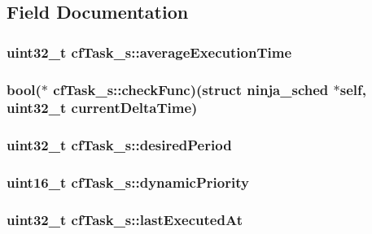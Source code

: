 \subsection{Field Documentation}
\hypertarget{structcfTask__s_a132b3b610c2181dcb2583ab23330abda}{
\subsubsection[{average\+Execution\+Time}]{\setlength{\rightskip}{0pt plus 5cm}uint32\+\_\+t cf\+Task\+\_\+s\+::average\+Execution\+Time}}\label{structcfTask__s_a132b3b610c2181dcb2583ab23330abda}
\hypertarget{structcfTask__s_a79e1d3beaa31d68bca80cb1057be23d5}{
\subsubsection[{check\+Func}]{\setlength{\rightskip}{0pt plus 5cm}bool($\ast$ cf\+Task\+\_\+s\+::check\+Func)(struct {\bf ninja\+\_\+sched} $\ast$self, uint32\+\_\+t current\+Delta\+Time)}}\label{structcfTask__s_a79e1d3beaa31d68bca80cb1057be23d5}
\hypertarget{structcfTask__s_adb81d1a2c7487daeb00adefa272b3c67}{
\subsubsection[{desired\+Period}]{\setlength{\rightskip}{0pt plus 5cm}uint32\+\_\+t cf\+Task\+\_\+s\+::desired\+Period}}\label{structcfTask__s_adb81d1a2c7487daeb00adefa272b3c67}
\hypertarget{structcfTask__s_a69a238e067da4f91c4d904903aded475}{
\subsubsection[{dynamic\+Priority}]{\setlength{\rightskip}{0pt plus 5cm}uint16\+\_\+t cf\+Task\+\_\+s\+::dynamic\+Priority}}\label{structcfTask__s_a69a238e067da4f91c4d904903aded475}
\hypertarget{structcfTask__s_a15b9476e69707e50cb8aca4eaf4b99b3}{
\subsubsection[{last\+Executed\+At}]{\setlength{\rightskip}{0pt plus 5cm}uint32\+\_\+t cf\+Task\+\_\+s\+::last\+Executed\+At}}\label{structcfTask__s_a15b9476e69707e50cb8aca4eaf4b99b3}
